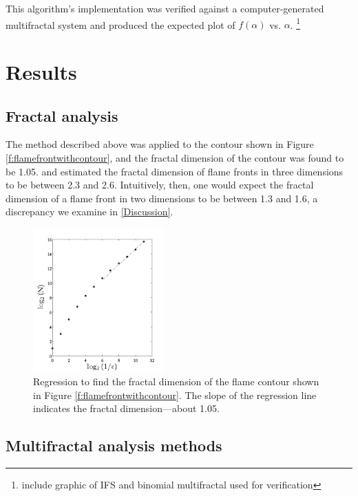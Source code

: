 \documentclass[iop]{emulateapj}
\begin{document}
This algorithm’s implementation was verified against a computer-generated multifractal system and produced the expected plot of $f(\alpha)$ vs. $\alpha$. \footnote{include graphic of IFS and binomial multifractal used for verification}

\section{Results}\label{Results}

\subsection{Fractal analysis}\label{FractalResults}
The method described above was applied to the contour shown in Figure \ref{f:flamefrontwithcontour}, and the fractal dimension of the contour was found to be 1.05. \cite{Timmes1994} and \cite{Blinnikov1996} estimated the fractal dimension of flame fronts in three dimensions to be between 2.3 and 2.6. Intuitively, then, one would expect the fractal dimension of a flame front in two dimensions to be between 1.3 and 1.6, a discrepancy we examine in \textsection \ref{Discussion}.

\begin{figure}
\begin{center}
\includegraphics[width=0.45\textwidth,clip=true]{Graphics/logNvsE.png}
\caption{Regression to find the fractal dimension of the flame contour shown in Figure \ref{f:flamefrontwithcontour}. The slope of the regression line indicates the fractal dimension—about 1.05.
\label{f:logNvsE}}
\end{center}
\end{figure} 


\subsection{Multifractal analysis methods}\label{MultifractalResults}
\end{document}
